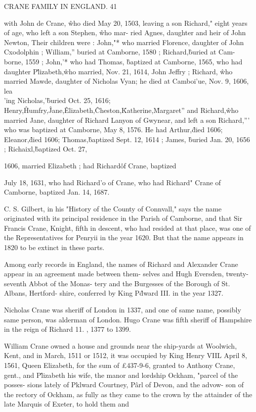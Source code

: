 \documentclass{book}
\begin{document}
CRANE FAMILY IN ENGLAND. 41 

with John de Crane, \^ who died May 20, 1503, leaving a son 
Richard," eight years of age, who left a son Stephen, \^ who mar- 
ried Agnes, daughter and heir of John Newton, Their children 
were : John,"* who married Florence, daughter of John Cxodolphin ; 
William,'' buried at Camborne, 1580 ; Richard,\^ buried at Cam- 
borne, 1559 ; John,'* who had Thomas, \^ baptized at Camborne, 
1565, who had daughter P\^lizabeth,\^ who married, Nov. 21, 1614, 
John Jeffry ; Richard, \^ who married Mawde, daughter of Nicholas 
Vyan; he died at Camboi'ue, Nov. 9, 1606, lea\\'ing Nicholas,'\^ 
buried Oct. 25, 1616; Henry,\^ Humfry,\^ Jane,\^ Elizabeth,\^ 
Cheston,\^ Katherine,\^ Margaret'' and Richard,\^ who married Jane, 
daughter of Richard Lanyon of Gwynear, and left a son Richard,''' 
who was baptized at Camborne, May 8, 1576. He had Arthur,\^ 
died 1606; Eleanor,\^ died 1606; Thomas,\^ baptized Sept. 12, 
1614 ; James, \^ buried Jan. 20, 1656 ; Richaixl,\^ baptized Oct. 27, 

1606, married Elizabeth ; had Richard\^ of Crane, baptized 

July 18, 1631, who had Richard'o of Crane, who had Richard" 
Crane of Camborne, baptized Jan. 14, 1687. 

C. S. Gilbert, in his "History of the County of Connvall," 
says the name originated with its principal residence in the Parish 
of Camborne, and that Sir Francis Crane, Knight, fifth in descent, 
who had resided at that place, was one of the Representatives for 
Penryii in the year 1620. But that the name appears in 1820 to 
be extinct in these parts. 

Among early records in England, the names of Richard and 
Alexander Crane appear in an agreement made between them- 
selves and Hugh Eversden, twenty-seventh Abbot of the Monas- 
tery and the Burgesses of the Borough of St. Albans, Hertford- 
shire, conferred by King P\^dward III. in the year 1327. 

Nicholas Crane was sheriff of London in 1337, and one of same 
name, possibly same person, was alderman of London. Hugo 
Crane was fifth sheriff of Hampshire in the reign of Richard 11. , 
1377 to 1399. 

William Crane owned a house and grounds near the ship-yards 
at Woolwich, Kent, and in March, 1511 or 1512, it was occupied 
by King Henry VIIL April 8, 1561, Queen Elizabeth, for the sum 
of £437-9-6, granted to Anthony Crane, gent., and P\^lizabeth 
his wife, the manor and lordship Ockham, "parcel of the posses- 
sions lately of Pklward Courtney, P\^arl of Devon, and the advow- 
son of the rectory of Ockham, as fully as they came to the crown 
by the attainder of the late Marquis of Exeter, to hold them and 
\end{document}
